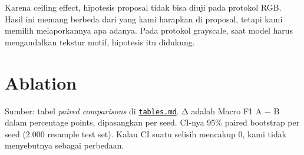 \documentclass[10pt,a4paper]{article}
\begin{document}
Karena ceiling effect, hipotesis proposal tidak bisa diuji pada protokol RGB. Hasil ini memang berbeda dari yang kami harapkan di proposal, tetapi kami memilih melaporkannya apa adanya. Pada protokol grayscale, saat model harus mengandalkan tekstur motif, hipotesis itu didukung.

\section{Ablation}\label{ablation}

Sumber: tabel \emph{paired comparisons} di \href{https://github.com/Universitas-Cakrawala/semarang-batik-fine-grained-transfer-learning/blob/main/artifacts/metrics/tables.md}{\texttt{tables.md}}. Δ adalah Macro F1 A − B dalam percentage points, dipasangkan per seed. CI-nya 95\% paired bootstrap per seed (2.000 resample test set). Kalau CI suatu selisih mencakup 0, kami tidak menyebutnya sebagai perbedaan.
\end{document}
